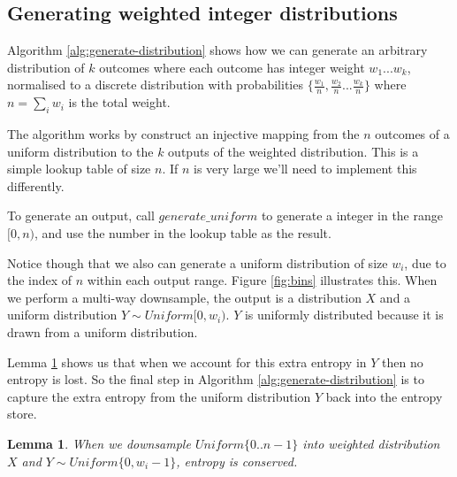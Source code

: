 \documentclass[12pt]{article}
\newtheorem{lemma}{Lemma}
\begin{document}
\subsection{Generating weighted integer distributions}

Algorithm \ref{alg:generate-distribution} shows how we can generate an arbitrary  distribution of $k$ outcomes where each outcome has integer weight ${w_1 ... w_k}$, normalised to a discrete distribution with probabilities $\{\frac{w_1}{n}, \frac{w_2}{n} ... \frac{w_k}{n}\}$ where $n=\sum_i w_i$ is the total weight.

The algorithm works by construct an injective mapping from the $n$ outcomes of a uniform distribution to the $k$ outputs of the weighted distribution. This is a simple lookup table of size $n$. If $n$ is very large we'll need to implement this differently.

To generate an output, call $generate\_uniform$ to generate a integer in the range $[0,n)$, and use the number in the lookup table as the result. 

Notice though that we also can generate a uniform distribution of size $w_i$, due to the index of $n$ within each output range. Figure \ref{fig:bins} illustrates this. When we perform a multi-way downsample, the output is a distribution $X$ and a uniform distribution $Y \sim Uniform [0,w_i)$. $Y$ is uniformly distributed because it is drawn from a uniform distribution.


Lemma \ref{lem:distribution-conservation} shows us that when we account for this extra entropy in $Y$ then no entropy is lost. So the final step in Algorithm \ref{alg:generate-distribution} is to capture the extra entropy from the uniform distribution $Y$ back into the entropy store.

\begin{lemma}
    \label{lem:distribution-conservation}
    When we downsample $Uniform\{0..n-1\}$ into weighted distribution $X$ and $Y \sim Uniform\{0,w_i-1\}$, entropy is conserved.
\end{lemma}
\end{document}
